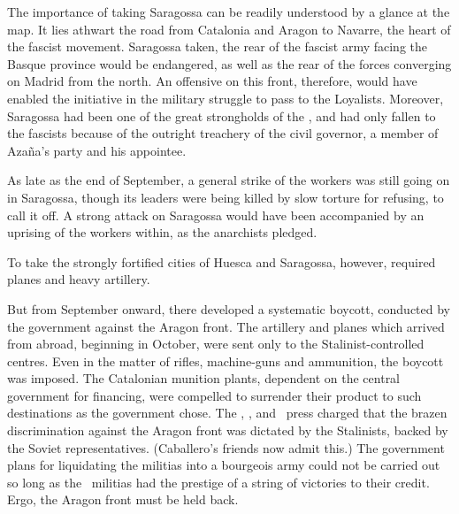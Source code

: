 \indexCNT{}
The importance of taking Saragossa can be readily understood by a glance at the map. It lies athwart the road from Catalonia and Aragon to Navarre, the heart of the fascist movement. Saragossa taken, the rear of the fascist army facing the Basque province would be endangered, as well as the rear of the forces converging on Madrid from the north. An offensive on this front, therefore, would have enabled the initiative in the military struggle to pass to the Loyalists. Moreover, Saragossa had been one of the great strongholds of the \CNT, and had only fallen to the fascists because of the outright treachery of the civil governor, a member of Azaña’s party and his appointee.

As late as the end of September, a general strike of the workers was still going on in Saragossa, though its leaders were being killed by slow torture for refusing, to call it off. A strong attack on Saragossa would have been accompanied by an uprising of the workers within, as the anarchists pledged.

To take the strongly fortified cities of Huesca and Saragossa, however, required planes and heavy artillery.

But from September onward, there developed a systematic boycott, conducted by the government against the Aragon front. The artillery and planes which arrived from abroad, beginning in October, were sent only to the Stalinist-controlled centres. Even in the matter of rifles, machine-guns and ammunition, the boycott was imposed. The Catalonian munition plants, dependent on the central government for financing, were compelled to surrender their product to such destinations as the government chose. The \CNT, \FAI, and \POUM\ press charged that the brazen discrimination against the Aragon front was dictated by the Stalinists, backed by the Soviet representatives. (Caballero’s friends now admit this.) The government plans for liquidating the militias into a bourgeois army could not be carried out so long as the \CNT\ militias had the prestige of a string of victories to their credit. Ergo, the Aragon front must be held back.

